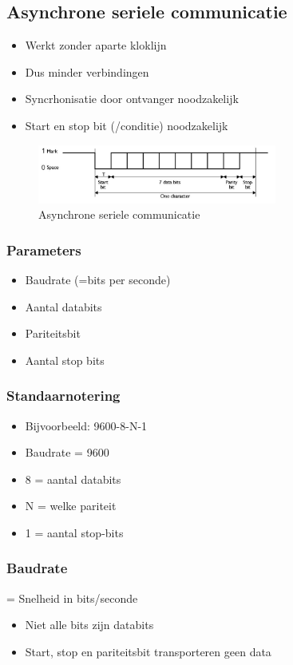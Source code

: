 \documentclass{article}
\begin{document}
\subsection{Asynchrone seriele communicatie}
\begin{itemize}
    \item Werkt zonder aparte kloklijn
    \item Dus minder verbindingen
    \item Syncrhonisatie door ontvanger noodzakelijk
    \item Start en stop bit (/conditie) noodzakelijk
\end{itemize}


\begin{figure}[H]
    \centering
    \includegraphics[width=0.7\textwidth]{Screenshot_20200323_121104.png}
    \caption{Asynchrone seriele communicatie}
\end{figure}

\subsubsection{Parameters}
\begin{itemize}
    \item Baudrate (=bits per seconde)
    \item Aantal databits
    \item Pariteitsbit
    \item Aantal stop bits
\end{itemize}

\subsubsection{Standaarnotering}
\begin{itemize}
    \item Bijvoorbeeld: 9600-8-N-1
    \item Baudrate = 9600
    \item 8 = aantal databits
    \item N = welke pariteit
    \item 1 = aantal stop-bits
\end{itemize}

\subsubsection{Baudrate}
= Snelheid in bits/seconde
\begin{itemize}
    \item Niet alle bits zijn databits
    \item Start, stop en pariteitsbit transporteren geen data
\end{itemize}
\end{document}
